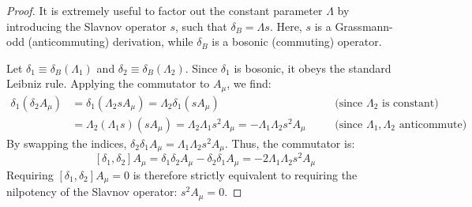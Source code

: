 \begin{proof}
    It is extremely useful to factor out the constant parameter \(\Lambda\) by introducing the Slavnov operator \(s\), such that \(\delta_B = \Lambda s\). Here, \(s\) is a Grassmann-odd (anticommuting) derivation, while \(\delta_B\) is a bosonic (commuting) operator.

    Let \(\delta_1 \equiv \delta_B(\Lambda_1)\) and \(\delta_2 \equiv \delta_B(\Lambda_2)\). Since \(\delta_1\) is bosonic, it obeys the standard Leibniz rule. Applying the commutator to \(A_\mu\), we find:
    \[
        \begin{aligned}
            \delta_1 (\delta_2 A_\mu) & = \delta_1 (\Lambda_2 s A_\mu) = \Lambda_2 \delta_1 (s A_\mu) \quad                                        &  & \text{(since \(\Lambda_2\) is constant)}            \\
                                      & = \Lambda_2 (\Lambda_1 s) (s A_\mu) = \Lambda_2 \Lambda_1 s^2 A_\mu = -\Lambda_1 \Lambda_2 s^2 A_\mu \quad &  & \text{(since \(\Lambda_1, \Lambda_2\) anticommute)}
        \end{aligned}
    \]
    By swapping the indices, \(\delta_2 \delta_1 A_\mu = \Lambda_1 \Lambda_2 s^2 A_\mu\). Thus, the commutator is:
    \[
        [\delta_1, \delta_2] A_\mu = \delta_1 \delta_2 A_\mu - \delta_2 \delta_1 A_\mu = -2 \Lambda_1 \Lambda_2 s^2 A_\mu
    \]
    Requiring \([\delta_1, \delta_2] A_\mu = 0\) is therefore strictly equivalent to requiring the nilpotency of the Slavnov operator: \(s^2 A_\mu = 0\).


\end{proof}
